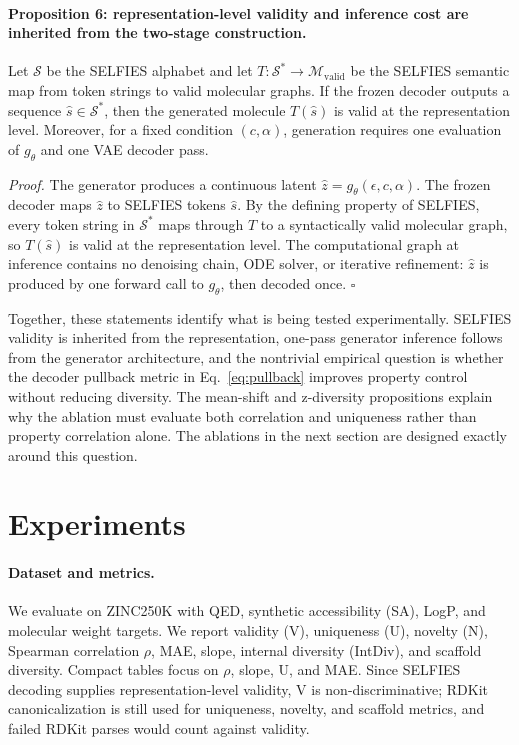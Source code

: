 \documentclass[letterpaper]{article}
\begin{document}
\paragraph{Proposition 6: representation-level validity and inference cost are
inherited from the two-stage construction.}
Let $\mathcal{S}$ be the SELFIES alphabet and let
$T:\mathcal{S}^{*}\rightarrow\mathcal{M}_{\mathrm{valid}}$ be the SELFIES
semantic map from token strings to valid molecular graphs.  If the frozen
decoder outputs a sequence $\hat s\in\mathcal{S}^{*}$, then the generated
molecule $T(\hat s)$ is valid at the representation level.  Moreover, for a fixed condition
$(c,\alpha)$, generation requires one evaluation of $g_\theta$ and one VAE
decoder pass.

\emph{Proof.}
The generator produces a continuous latent $\hat z=g_\theta(\epsilon,c,\alpha)$.
The frozen decoder maps $\hat z$ to SELFIES tokens $\hat s$.  By the defining
property of SELFIES, every token string in $\mathcal{S}^{*}$ maps through $T$
to a syntactically valid molecular graph, so $T(\hat s)$ is valid at the
representation level.  The
computational graph at inference contains no denoising chain, ODE solver, or
iterative refinement: $\hat z$ is produced by one forward call to $g_\theta$,
then decoded once. \hfill $\square$

Together, these statements identify what is being tested experimentally.
SELFIES validity is inherited from the representation, one-pass generator inference follows
from the generator architecture, and the nontrivial empirical question is
whether the decoder pullback metric in Eq.~\eqref{eq:pullback} improves
property control without reducing diversity.  The mean-shift and z-diversity
propositions explain why the ablation must evaluate both correlation and
uniqueness rather than property correlation alone.  The ablations in the next
section are designed exactly around this question.

\section{Experiments}

\paragraph{Dataset and metrics.}
We evaluate on ZINC250K \cite{irwin2012zinc} with QED, synthetic accessibility
(SA), LogP, and molecular weight targets. We report validity (V), uniqueness
(U), novelty (N), Spearman correlation $\rho$, MAE, slope, internal diversity
(IntDiv), and scaffold diversity. Compact tables focus
on $\rho$, slope, U, and MAE. Since SELFIES decoding supplies representation-level
validity, V is non-discriminative; RDKit canonicalization is still used for
uniqueness, novelty, and scaffold metrics, and failed RDKit parses would count
against validity.
\end{document}
